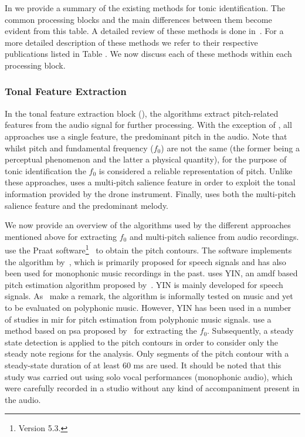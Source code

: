 In  we provide a summary of the existing methods for tonic identification. The common processing blocks and the main differences between them become evident from this table. A detailed review of these methods is done in~\cite{Gulati2014Tonic}. For a more detailed description of these methods we refer to their respective publications listed in Table . We now discuss each of these methods within each processing block.


\subsubsection{Tonal Feature Extraction}
\label{Feature Extraction}

In the tonal feature extraction block (), the algorithms extract pitch-related
features from the audio signal for further processing. With the exception of \cite{salamon2012multipitch,gulati2012two}, all approaches use a single feature, the predominant pitch in the audio. Note that whilst pitch and fundamental frequency ($f_0$) are not the same (the former being a perceptual phenomenon and the latter a physical quantity), for the purpose of tonic identification the $f_0$ is considered a reliable representation of pitch. Unlike these approaches, \cite{salamon2012multipitch} uses a multi-pitch salience feature in order to exploit the tonal information provided by the drone instrument. Finally, \cite{gulati2012two} uses both the multi-pitch salience feature and the predominant melody. 

We now provide an overview of the algorithms used by the different approaches mentioned above for extracting $f_0$ and multi-pitch salience from audio recordings. \cite{ranjani2011carnatic} use the Praat software\footnote{Version 5.3.}~\cite{BoersmaPaul2001} to obtain the pitch contours. The software implements the algorithm by~\cite{boersma1993accurate}, which is primarily proposed for speech signals and has also been used for monophonic music recordings in the past. \cite{Ashwin_Istanbul2012} uses YIN, an \gls{amdf} based pitch estimation algorithm proposed by~\cite{DeCheveigne2002}. YIN is mainly developed for speech signals. As~\cite{DeCheveigne2002} make a remark,  the algorithm is informally tested on music and yet to be evaluated on polyphonic music. However, YIN has been used in a number of studies in \gls{mir} for pitch estimation from polyphonic music signals. \cite{Sengupta2005b} use a method based on \gls{psa} proposed by~\cite{AKDatta_1996} for extracting the $f_0$. Subsequently, a steady state detection is applied to the pitch contours in order to consider only the steady note regions for the analysis. Only segments of the pitch contour with a steady-state duration of at least 60 ms are used. It should be noted that this study was carried out using solo vocal performances (monophonic audio), which were carefully recorded in a studio without any kind of accompaniment present in the audio.

